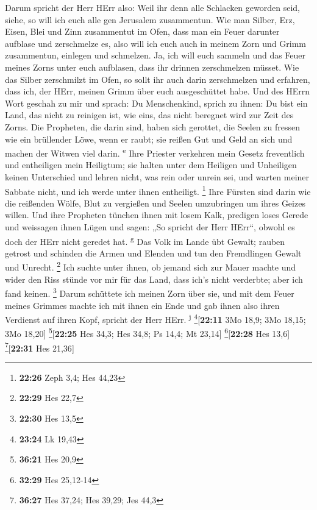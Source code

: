 Darum spricht der Herr HErr also: Weil ihr denn alle Schlacken geworden
seid, siehe, so will ich euch alle gen Jerusalem zusammentun.
 Wie man Silber, Erz, Eisen, Blei und Zinn zusammentut im
Ofen, dass man ein Feuer darunter aufblase und zerschmelze es, also will
ich euch auch in meinem Zorn und Grimm zusammentun, einlegen und
schmelzen.  Ja, ich will euch sammeln und das Feuer
meines Zorns unter euch aufblasen, dass ihr drinnen zerschmelzen müsset.
 Wie das Silber zerschmilzt im Ofen, so sollt ihr auch
darin zerschmelzen und erfahren, dass ich, der HErr, meinen Grimm über
euch ausgeschüttet habe.  Und des HErrn Wort geschah zu
mir und sprach:  Du Menschenkind, sprich zu ihnen: Du
bist ein Land, das nicht zu reinigen ist, wie eins, das nicht beregnet
wird zur Zeit des Zorns.  Die Propheten, die darin sind,
haben sich gerottet, die Seelen zu fressen wie ein brüllender Löwe, wenn
er raubt; sie reißen Gut und Geld an sich und machen der Witwen viel
darin. \textsuperscript{e}  Ihre Priester verkehren mein
Gesetz freventlich und entheiligen mein Heiligtum; sie halten unter dem
Heiligen und Unheiligen keinen Unterschied und lehren nicht, was rein
oder unrein sei, und warten meiner Sabbate nicht, und ich werde unter
ihnen entheiligt. \footnote{\textbf{22:26} Zeph 3,4; Hes 44,23}
 Ihre Fürsten sind darin wie die reißenden Wölfe, Blut zu
vergießen und Seelen umzubringen um ihres Geizes willen. 
Und ihre Propheten tünchen ihnen mit losem Kalk, predigen loses Gerede
und weissagen ihnen Lügen und sagen: „So spricht der Herr HErr``, obwohl
es doch der HErr nicht geredet hat. \textsuperscript{g} 
Das Volk im Lande übt Gewalt; rauben getrost und schinden die Armen und
Elenden und tun den Fremdlingen Gewalt und Unrecht. \footnote{\textbf{22:29}
  Hes 22,7}  Ich suchte unter ihnen, ob jemand sich zur
Mauer machte und wider den Riss stünde vor mir für das Land, dass ich's
nicht verderbte; aber ich fand keinen. \footnote{\textbf{22:30} Hes 13,5}
 Darum schüttete ich meinen Zorn über sie, und mit dem
Feuer meines Grimmes machte ich mit ihnen ein Ende und gab ihnen also
ihren Verdienst auf ihren Kopf, spricht der Herr HErr.
\textsuperscript{j} \footnote{\textbf{23:24} Lk 19,43}{[}\textbf{22:11}
3Mo 18,9; 3Mo 18,15; 3Mo 18,20{]} \footnote{\textbf{36:21} Hes 20,9}{[}\textbf{22:25}
Hes 34,3; Hes 34,8; Ps 14,4; Mt 23,14{]} \footnote{\textbf{32:29} Hes
  25,12-14}{[}\textbf{22:28} Hes 13,6{]} \footnote{\textbf{36:27} Hes
  37,24; Hes 39,29; Jes 44,3}{[}\textbf{22:31} Hes 21,36{]}

